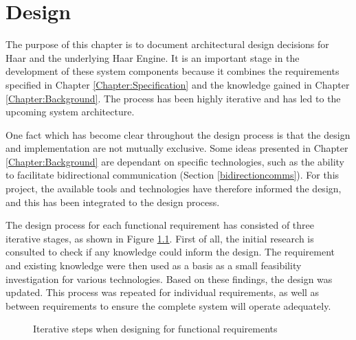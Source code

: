 \chapter{Design}
\label{chapter:design}
   The purpose of this chapter is to document architectural design decisions for Haar and the underlying Haar Engine. It is an important stage in the development of these system components because it combines the requirements specified in Chapter \ref{Chapter:Specification} and the knowledge gained in Chapter \ref{Chapter:Background}. The process has been highly iterative and has led to the upcoming system architecture. 

   One fact which has become clear throughout the design process is that the design and implementation are not mutually exclusive. Some ideas presented in Chapter \ref{Chapter:Background} are dependant on specific technologies, such as the ability to facilitate bidirectional communication (Section \ref{bidirectioncomms}). For this project, the available tools and technologies have therefore informed the design, and this has been integrated to the design process.

   The design process for each functional requirement has consisted of three iterative stages, as shown in Figure \ref{figure:design-process}. First of all, the initial research is consulted to check if any knowledge could inform the design. The requirement and existing knowledge were then used as a basis as a small feasibility investigation for various technologies. Based on these findings, the design was updated. This process was repeated for individual requirements, as well as between requirements to ensure the complete system will operate adequately.

   \begin{figure}
    \centering
    \caption{Iterative steps when designing for functional requirements}\label{figure:design-process}
  \end{figure}

